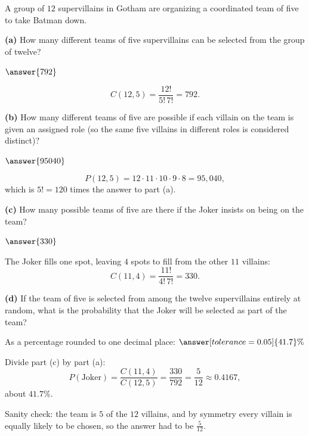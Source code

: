 \documentclass[12pt]{ximera}
\begin{document}
\begin{problem}
A group of $12$ supervillains in Gotham are organizing a coordinated team of five to
take Batman down.

\begin{prompt}
\textbf{(a)} How many different teams of five supervillains can be selected from the
group of twelve?

$\answer{792}$

\begin{feedback}
\[ C(12,5)=\frac{12!}{5!\,7!}=792. \]
\end{feedback}
\end{prompt}

\begin{prompt}
\textbf{(b)} How many different teams of five are possible if each villain on the
team is given an assigned role (so the same five villains in different roles is
considered distinct)?

$\answer{95040}$

\begin{feedback}
\[ P(12,5)=12\cdot 11\cdot 10\cdot 9\cdot 8 = 95{,}040, \]
which is $5!=120$ times the answer to part (a).
\end{feedback}
\end{prompt}

\begin{prompt}
\textbf{(c)} How many possible teams of five are there if the Joker insists on being
on the team?

$\answer{330}$

\begin{feedback}
The Joker fills one spot, leaving $4$ spots to fill from the other $11$ villains:
\[ C(11,4)=\frac{11!}{4!\,7!}=330. \]
\end{feedback}
\end{prompt}

\begin{prompt}
\textbf{(d)} If the team of five is selected from among the twelve supervillains
entirely at random, what is the probability that the Joker will be selected as part
of the team?

As a percentage rounded to one decimal place: $\answer[tolerance=0.05]{41.7}\%$

\begin{feedback}
Divide part (c) by part (a):
\[
P(\text{Joker})=\frac{C(11,4)}{C(12,5)}=\frac{330}{792}=\frac{5}{12}\approx 0.4167,
\]
about $41.7\%$.

Sanity check: the team is $5$ of the $12$ villains, and by symmetry every villain is
equally likely to be chosen, so the answer had to be $\frac{5}{12}$.
\end{feedback}
\end{prompt}
\end{problem}
\end{document}
